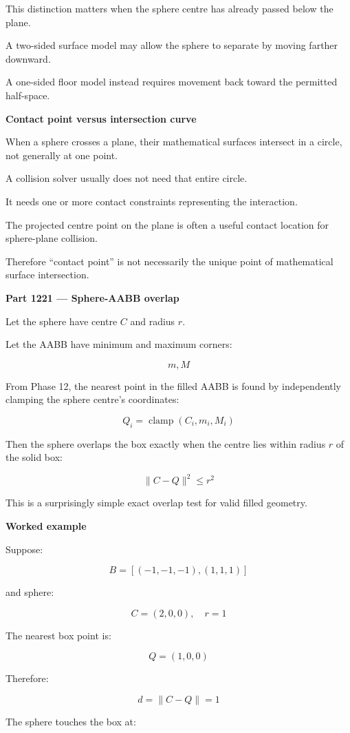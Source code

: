 This distinction matters when the sphere centre has already passed below the plane.

A two-sided surface model may allow the sphere to separate by moving farther downward.

A one-sided floor model instead requires movement back toward the permitted half-space.

\textbf{Contact point versus intersection curve}

When a sphere crosses a plane, their mathematical surfaces intersect in a circle, not generally at one point.

A collision solver usually does not need that entire circle.

It needs one or more contact constraints representing the interaction.

The projected centre point on the plane is often a useful contact location for sphere-plane collision.

Therefore ``contact point'' is not necessarily the unique point of mathematical surface intersection.

\textbf{Part 1221 --- Sphere-AABB overlap}

Let the sphere have centre \(C\) and radius \(r\).

Let the AABB have minimum and maximum corners:

\[
m,M
\]

From Phase 12, the nearest point in the filled AABB is found by independently clamping the sphere centre's coordinates:

\[
\boxed{ Q_i=\operatorname{clamp}(C_i,m_i,M_i) }
\]

Then the sphere overlaps the box exactly when the centre lies within radius \(r\) of the solid box:

\[
\boxed{ \|C-Q\|^2\le r^2 }
\]

This is a surprisingly simple exact overlap test for valid filled geometry.

\textbf{Worked example}

Suppose:

\[
B=[(-1,-1,-1),(1,1,1)]
\]

and sphere:

\[
C=(2,0,0),\quad r=1
\]

The nearest box point is:

\[
Q=(1,0,0)
\]

Therefore:

\[
d=\|C-Q\|=1
\]

The sphere touches the box at:

